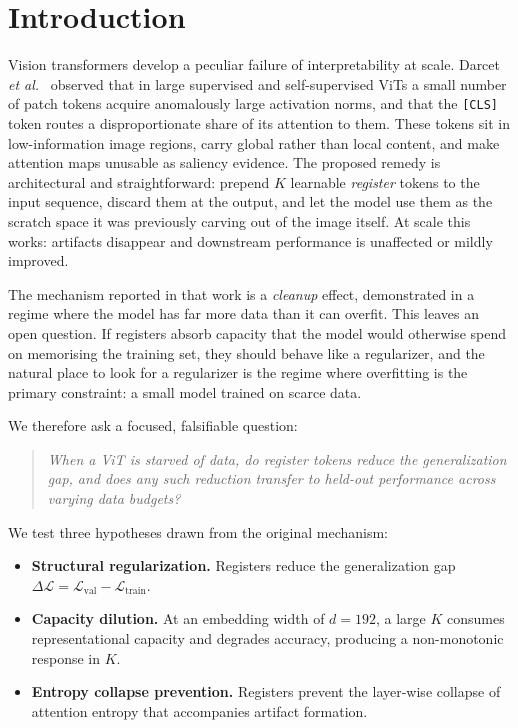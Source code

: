 \section{Introduction}

Vision transformers develop a peculiar failure of interpretability at scale.
Darcet \textit{et al.}~\cite{darcet2024registers} observed that in large
supervised and self-supervised ViTs a small number of patch tokens acquire
anomalously large activation norms, and that the \texttt{[CLS]} token routes a
disproportionate share of its attention to them. These tokens sit in
low-information image regions, carry global rather than local content, and make
attention maps unusable as saliency evidence. The proposed remedy is
architectural and straightforward: prepend $K$ learnable \emph{register} tokens to the
input sequence, discard them at the output, and let the model use them as the
scratch space it was previously carving out of the image itself. At scale this
works: artifacts disappear and downstream performance is unaffected or
mildly improved.

The mechanism reported in that work is a \emph{cleanup} effect, demonstrated in
a regime where the model has far more data than it can overfit. This leaves an
open question. If registers absorb capacity that the model would
otherwise spend on memorising the training set, they should behave like a
regularizer, and the natural place to look for a regularizer is the regime where
overfitting is the primary constraint: a small model trained on scarce data.

We therefore ask a focused, falsifiable question:

\begin{quote}
\textit{When a ViT is starved of data, do register tokens reduce the
generalization gap, and does any such reduction transfer to held-out
performance across varying data budgets?}
\end{quote}

We test three hypotheses drawn from the original mechanism:

\begin{itemize}
\item[\textbf{H1}] \textbf{Structural regularization.} Registers reduce the
generalization gap $\Delta\mathcal{L} = \mathcal{L}_{\mathrm{val}} -
\mathcal{L}_{\mathrm{train}}$.
\item[\textbf{H2}] \textbf{Capacity dilution.} At an embedding width of
$d = 192$, a large $K$ consumes representational capacity and degrades
accuracy, producing a non-monotonic response in $K$.
\item[\textbf{H3}] \textbf{Entropy collapse prevention.} Registers prevent the
layer-wise collapse of attention entropy that accompanies artifact formation.
\end{itemize}

